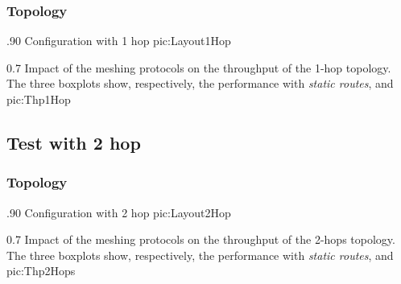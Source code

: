     \subsubsection{Topology}

                {.90\columnwidth}
                {Configuration with 1 hop}
                {pic:Layout1Hop}

                {0.7 \columnwidth}
                {Impact of the meshing protocols on the throughput of the
                 1-hop topology. The three boxplots show, respectively, the
                 performance with \emph{static routes}, \emph{\batman} and
                 \emph{\olsr}}
                {pic:Thp1Hop}

\subsection{Test with 2 hop}

    \subsubsection{Topology}

                {.90\columnwidth}
                {Configuration with 2 hop}
                {pic:Layout2Hop}

                {0.7 \columnwidth}
                {Impact of the meshing protocols on the throughput of the
                 2-hops topology. The three boxplots show, respectively,
                 the performance with \emph{static routes}, \emph{\batman}
                 and \emph{\olsr}}
                {pic:Thp2Hops}

